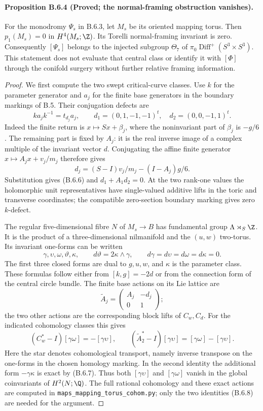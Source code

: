 \paragraph{Proposition B.6.4 (Proved; the normal-framing obstruction vanishes).}
For the monodromy $\Psi_s$ in B.6.3, let $M_s$ be its oriented mapping
torus. Then $p_1(M_s)=0$ in $H^4(M_s;\Z)$. Its Torelli
normal-framing invariant is zero. Consequently $[\Psi_s]$ belongs
to the injected subgroup $\Theta_7$ of
$\pi_0\operatorname{Diff}^+(S^3\times S^3)$.
This statement does not evaluate that central class or identify it
with $[\Phi]$ through the conifold surgery without further relative
framing information.
\begin{proof}
We first compute the two swept critical-curve classes. Use $k$ for
the parameter generator and $a_j$ for the finite base generators in
the boundary markings of B.5. Their conjugation defects are
\[
 k a_j k^{-1}=t_{d_j}a_j,\qquad
 d_1=(0,1,-1,-1)^t,\quad d_2=(0,0,-1,1)^t.
 \tag{B.6.6}
\]
Indeed the finite return is $x\mapsto Sx+\beta_j$, where the
noninvariant part of $\beta_j$ is $-g/6$. The remaining part is
fixed by $A_j$: it is the real inverse image of a complex multiple
of the invariant vector $d$. Conjugating the affine finite generator
$x\mapsto A_jx+v_j/m_j$ therefore gives
\[
 d_j=(S-I)v_j/m_j-(I-A_j)g/6.
\]
Substitution gives (B.6.6) and $d_1+A_1d_2=0$. At the two
rank-one values the holomorphic unit representatives have
single-valued additive lifts in the toric and transverse coordinates;
the compatible zero-section boundary marking gives zero $k$-defect.

The regular five-dimensional fibre $N$ of $M_s\to B$ has fundamental
group $\Lambda\rtimes_S\Z$. It is the product of a three-dimensional
nilmanifold and the $(u,w)$ two-torus. Its invariant one-forms can be
written
\[
 \gamma,\upsilon,\omega,\vartheta,\kappa,
 \qquad d\vartheta=2\kappa\wedge\gamma,
 \qquad d\gamma=d\upsilon=d\omega=d\kappa=0.
 \tag{B.6.7}
\]
The first three closed forms are dual to $g,u,w$, and $\kappa$ is
the parameter class. These formulas follow either from
$[k,g]=-2d$ or from the connection form of the central circle bundle.
The finite base actions on its Lie lattice are
\[
 \widetilde A_j=
 \begin{pmatrix}A_j&-d_j\\0&1\end{pmatrix};
\]
the two other actions are the corresponding block lifts of $C_w,C_d$.
For the indicated cohomology classes this gives
\[
 (C_w^*-I)[\gamma\omega]=-[\gamma\upsilon],\qquad
 (\widetilde A_2^*-I)[\gamma\upsilon]
       =[\gamma\omega]-[\gamma\upsilon].
 \tag{B.6.8}
\]
Here the star denotes cohomological transport, namely inverse
transpose on the one-forms in the chosen homology marking.
In the second identity the additional form $-\gamma\kappa$ is
exact by (B.6.7). Thus both $[\gamma\upsilon]$ and
$[\gamma\omega]$ vanish in the global coinvariants of $H^2(N;\Q)$.
The full rational cohomology and these exact actions are computed in
\texttt{maps\_mapping\_torus\_cohom.py}; only the two identities
(B.6.8) are needed for the argument.


\end{proof}
